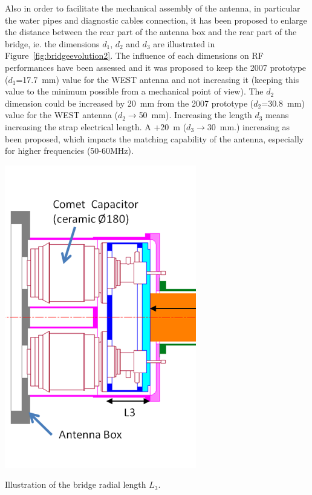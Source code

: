 {Also in order to facilitate the mechanical assembly of the antenna, in particular the water pipes and diagnostic cables connection, it has been proposed to enlarge the distance between the rear part of the antenna box and the rear part of the bridge, ie. the dimensions $d_1$, $d_2$ and $d_3$ are illustrated in Figure~\ref{fig:bridgeevolution2}. The influence of each dimensions on RF performances have been assessed and it was proposed to keep the 2007 prototype ($d_1$=17.7~mm) value for the WEST antenna and not increasing it (keeping this value to the minimum possible from a mechanical point of view). The $d_2$ dimension could be increased by 20~mm from the 2007 prototype ($d_2$=30.8~mm) value for the WEST antenna ($d_2\to$50~mm). Increasing the length $d_3$ means increasing the strap electrical length. A +20~m ($d_3\to$30~mm.) increasing as been proposed, which impacts the matching capability of the antenna, especially for higher frequencies (50-60MHz). 

\begin{marginfigure}[-3cm]
	\centering
	\includegraphics[width=0.8\linewidth]{figures/chap3/WEST_ICRH/bridge_evolution3}
	\caption{Illustration of the bridge radial length $L_3$.}
	\label{fig:bridgeevolution3}
\end{marginfigure}

}
